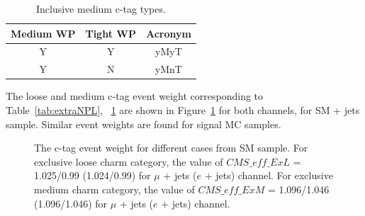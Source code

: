 \begin{table}
\begin{center}
\begin{tabular}{ccc}
\hline
\hline
{\bf{Medium WP}} & {\bf{Tight WP}} & {\bf{Acronym}} \\
\hline
\hline
 Y & Y & yMyT \\
 Y & N & yMnT \\
\hline
\end{tabular}
\caption{Inclusive medium c-tag types.}
\label{tab:extraNPM}
\end{center}
\end{table}
The loose and medium c-tag event weight corresponding to Table~\ref{tab:extraNPL},
~\ref{tab:extraNPM} are shown in Figure~\ref{fig:extraNP} for both channels, for SM \ttbar +
jets sample. Similar event weights are found for signal MC samples.
\begin{figure}
\centering  
{}
\vfil
{}
\caption{The c-tag event weight for different cases from SM \ttbar 
    sample. For exclusive loose charm category, the value of 
    $CMS\_eff\_ExL$ = 1.025/0.99 (1.024/0.99) for $\mu$ + jets 
    ($e$ + jets) channel. For exclusive medium charm category, the value of
    $CMS\_eff\_ExM$ = 1.096/1.046 (1.096/1.046) for $\mu$ + jets 
    ($e$ + jets) channel.}
\label{fig:extraNP}
\end{figure}


